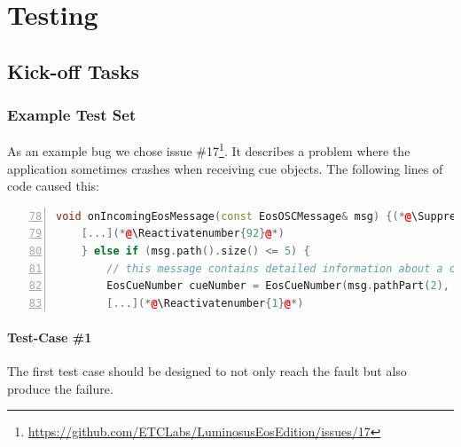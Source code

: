 \documentclass{scrreprt}
\makeatletter
\let\origthelstnumber\thelstnumber
\newcommand*\Reactivatenumber[1]{%
	\setcounter{lstnumber}{\numexpr#1-1\relax}
	\lst@AddToHook{OnNewLine}{%
		\let\thelstnumber\origthelstnumber%
		\refstepcounter{lstnumber}
	}%
}
\makeatother
\begin{document}
\chapter{Testing}

\section{Kick-off Tasks}

\subsection{Example Test Set}

As an example bug we chose issue \#17\footnote{\url{https://github.com/ETCLabs/LuminosusEosEdition/issues/17}}. It describes a problem where the application sometimes crashes when receiving cue objects. The following lines of code caused this:

\bigskip
\begin{lstlisting}[language=C++,
							numbers=left,
							firstnumber=78,
							directivestyle={\color{black}}
							emph={int,char,double,float,unsigned},
							emphstyle={\color{blue}},
							title=src/OSCNetworkManager.cpp]
void onIncomingEosMessage(const EosOSCMessage& msg) {(*@\Suppressnumber@*)
    [...](*@\Reactivatenumber{92}@*)
    } else if (msg.path().size() <= 5) {
        // this message contains detailed information about a cue
        EosCueNumber cueNumber = EosCueNumber(msg.pathPart(2), msg.pathPart(3), msg.pathPart(4));(*@\Suppressnumber@*)
        [...](*@\Reactivatenumber{1}@*)
\end{lstlisting}
\bigskip

\subsubsection{Test-Case \#1}
\label{test-case-1}

The first test case should be designed to not only reach the fault but also produce the failure.
\end{document}
